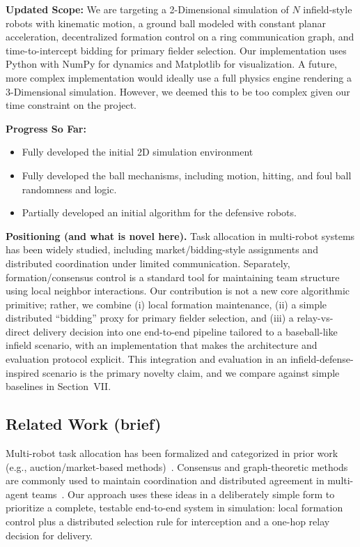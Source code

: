 \documentclass[conference]{IEEEtran}
\begin{document}
\textbf{Updated Scope:} We are targeting a 2-Dimensional simulation of $N$ infield-style robots with kinematic motion, a ground ball modeled with constant planar acceleration, decentralized formation control on a ring communication graph, and time-to-intercept bidding for primary fielder selection. Our implementation uses Python with NumPy for dynamics and Matplotlib for visualization. A future, more complex implementation would ideally use a full physics engine rendering a 3-Dimensional simulation. However, we deemed this to be too complex given our time constraint on the project.

\textbf{Progress So Far:}
\begin{itemize}
    \item Fully developed the initial 2D simulation environment
    \item Fully developed the ball mechanisms, including motion, hitting, and foul ball randomness and logic.
    \item Partially developed an initial algorithm for the defensive robots.
\end{itemize}

\textbf{Positioning (and what is novel here).} Task allocation in multi-robot systems has been widely studied, including market/bidding-style assignments and distributed coordination under limited communication. Separately, formation/consensus control is a standard tool for maintaining team structure using local neighbor interactions. Our contribution is not a new core algorithmic primitive; rather, we combine (i) local formation maintenance, (ii) a simple distributed ``bidding'' proxy for primary fielder selection, and (iii) a relay-vs-direct delivery decision into one end-to-end pipeline tailored to a baseball-like infield scenario, with an implementation that makes the architecture and evaluation protocol explicit. This integration and evaluation in an infield-defense-inspired scenario is the primary novelty claim, and we compare against simple baselines in Section~VII.

\subsection{Related Work (brief)}
Multi-robot task allocation has been formalized and categorized in prior work (e.g., auction/market-based methods)~\cite{gerkey2004}. Consensus and graph-theoretic methods are commonly used to maintain coordination and distributed agreement in multi-agent teams~\cite{mesbahi2010,olfati2006}. Our approach uses these ideas in a deliberately simple form to prioritize a complete, testable end-to-end system in simulation: local formation control plus a distributed selection rule for interception and a one-hop relay decision for delivery.
\end{document}
